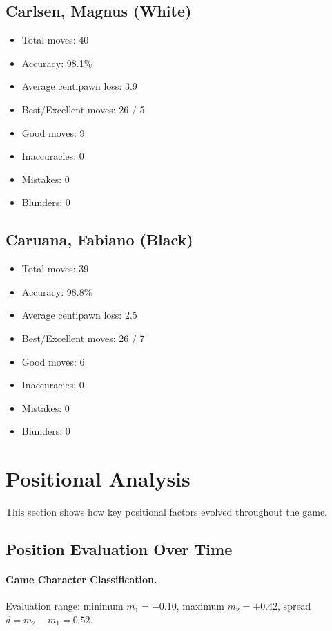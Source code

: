 \documentclass[11pt]{book}
\begin{document}
\subsection{Carlsen, Magnus (White)}
\begin{itemize}
\item Total moves: 40
\item Accuracy: 98.1\%
\item Average centipawn loss: 3.9
\item Best/Excellent moves: 26 / 5
\item Good moves: 9
\item Inaccuracies: 0
\item Mistakes: 0
\item Blunders: 0
\end{itemize}

\subsection{Caruana, Fabiano (Black)}
\begin{itemize}
\item Total moves: 39
\item Accuracy: 98.8\%
\item Average centipawn loss: 2.5
\item Best/Excellent moves: 26 / 7
\item Good moves: 6
\item Inaccuracies: 0
\item Mistakes: 0
\item Blunders: 0
\end{itemize}

\section{Positional Analysis}

This section shows how key positional factors evolved throughout the game.

\subsection{Position Evaluation Over Time}

\paragraph{Game Character Classification.}
Evaluation range: minimum $m_1 = -0.10$, maximum $m_2 = +0.42$, spread $d = m_2 - m_1 = 0.52$.
\end{document}
